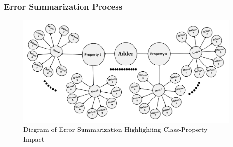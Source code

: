\documentclass[10pt, conference, a4paper, final]{IEEEtran}
\begin{document}
\subsubsection{Error Summarization Process}

\begin{figure}[H]
    \centering
    \includegraphics[width=\linewidth]{paper_images/step5.pdf}
    \caption{Diagram of Error Summarization Highlighting Class-Property Impact}
    \label{fig:error-summarization}
\end{figure}
\end{document}
